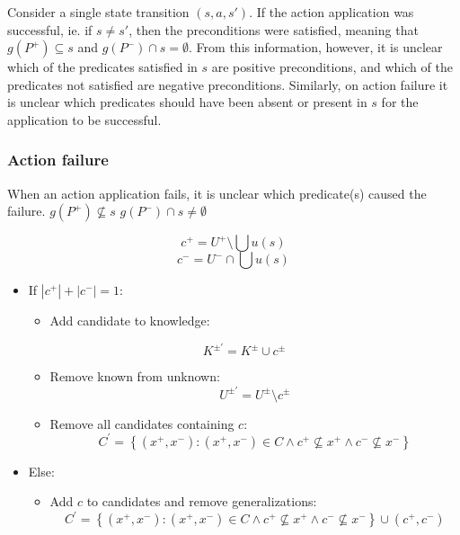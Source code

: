 \documentclass[../master.tex]{subfiles}
\begin{document}
    Consider a single state transition $\left(s,a,s'\right)$. If the
action application was successful, ie. if $s\neq s'$, then the preconditions
were satisfied, meaning that $g\left(P^{+}\right)\subseteq s$ and
$g\left(P^{-}\right)\cap s=\emptyset$. From this information, however,
it is unclear which of the predicates satisfied in $s$ are positive
preconditions, and which of the predicates not satisfied are negative
preconditions. Similarly, on action failure it is unclear which predicates
should have been absent or present in $s$ for the application to
be successful.


\subsubsection*{Action failure}

When an action application fails, it is unclear which predicate(s)
caused the failure. $g\left(P^{+}\right)\nsubseteq s$ $g\left(P^{-}\right)\cap s\neq\emptyset$

\[
c^{+}=U^{+}\setminus\bigcup u\left(s\right)
\]
\[
c^{-}=U^{-}\cap\bigcup u\left(s\right)
\]

\begin{itemize}
\item If $\left|c^{+}\right|+\left|c^{-}\right|=1$:

\begin{itemize}
\item Add candidate to knowledge:
\end{itemize}

\[
K^{\pm\prime}=K^{\pm}\cup c^{\pm}
\]

\begin{itemize}
\item Remove known from unknown:
\[
U^{\pm\prime}=U^{\pm}\setminus c^{\pm}
\]

\item Remove all candidates containing $c$:
\[
C^{\prime}=\left\{ \left(x^{+},x^{-}\right):\left(x^{+},x^{-}\right)\in C\land c^{+}\nsubseteq x^{+}\land c^{-}\nsubseteq x^{-}\right\}
\]

\end{itemize}
\item Else:

\begin{itemize}
\item Add $c$ to candidates and remove generalizations:
\[
C^{\prime}=\left\{ \left(x^{+},x^{-}\right):\left(x^{+},x^{-}\right)\in C\land c^{+}\nsubseteq x^{+}\land c^{-}\nsubseteq x^{-}\right\} \cup\left(c^{+},c^{-}\right)
\]

\end{itemize}
\end{itemize}
\end{document}
